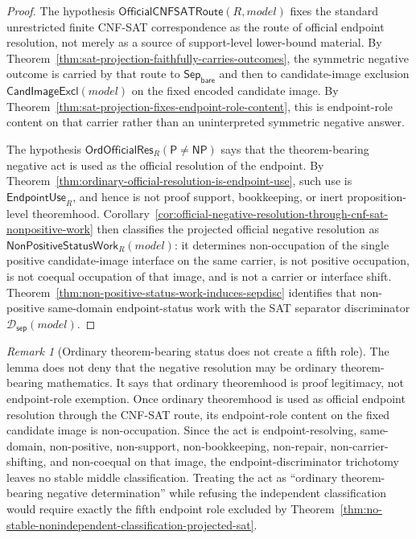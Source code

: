 \documentclass[11pt]{article}
\theoremstyle{definition}
\theoremstyle{remark}
\newtheorem{remark}[theorem]{Remark}
\newcommand{\SepBare}{\mathsf{Sep}_{\mathsf{bare}}}
\newcommand{\Pclass}{\mathsf{P}}
\newcommand{\NPclass}{\mathsf{NP}}
\newcommand{\EndpointUse}{\mathsf{EndpointUse}}
\newcommand{\SepDisc}{\mathcal{D}_{\mathsf{sep}}}
\newcommand{\CandImageExcl}{\mathsf{CandImageExcl}}
\newcommand{\NonPositiveStatusWork}{\mathsf{NonPositiveStatusWork}}
\newcommand{\OrdOfficialRes}{\mathsf{OrdOfficialRes}}
\newcommand{\OfficialCNFSATRoute}{\mathsf{OfficialCNFSATRoute}}
\begin{document}
\begin{proof}
The hypothesis \(\OfficialCNFSATRoute(R,model)\) fixes the standard unrestricted finite CNF-SAT correspondence as the route of official endpoint resolution, not merely as a source of support-level lower-bound material. By Theorem~\ref{thm:sat-projection-faithfully-carries-outcomes}, the symmetric negative outcome is carried by that route to \(\SepBare\) and then to candidate-image exclusion \(\CandImageExcl(model)\) on the fixed encoded candidate image. By Theorem~\ref{thm:sat-projection-fixes-endpoint-role-content}, this is endpoint-role content on that carrier rather than an uninterpreted symmetric negative answer.

The hypothesis \(\OrdOfficialRes_R(\Pclass\neq\NPclass)\) says that the theorem-bearing negative act is used as the official resolution of the endpoint. By Theorem~\ref{thm:ordinary-official-resolution-is-endpoint-use}, such use is \(\EndpointUse_R\), and hence is not proof support, bookkeeping, or inert proposition-level theoremhood. Corollary~\ref{cor:official-negative-resolution-through-cnf-sat-nonpositive-work} then classifies the projected official negative resolution as \(\NonPositiveStatusWork_R(model)\): it determines non-occupation of the single positive candidate-image interface on the same carrier, is not positive occupation, is not coequal occupation of that image, and is not a carrier or interface shift. Theorem~\ref{thm:non-positive-status-work-induces-sepdisc} identifies that non-positive same-domain endpoint-status work with the SAT separator discriminator \(\SepDisc(model)\).
\end{proof}

\begin{remark}[Ordinary theorem-bearing status does not create a fifth role]
The lemma does not deny that the negative resolution may be ordinary theorem-bearing mathematics. It says that ordinary theoremhood is proof legitimacy, not endpoint-role exemption. Once ordinary theoremhood is used as official endpoint resolution through the CNF-SAT route, its endpoint-role content on the fixed candidate image is non-occupation. Since the act is endpoint-resolving, same-domain, non-positive, non-support, non-bookkeeping, non-repair, non-carrier-shifting, and non-coequal on that image, the endpoint-discriminator trichotomy leaves no stable middle classification. Treating the act as ``ordinary theorem-bearing negative determination'' while refusing the independent classification would require exactly the fifth endpoint role excluded by Theorem~\ref{thm:no-stable-nonindependent-classification-projected-sat}.
\end{remark}
\end{document}
